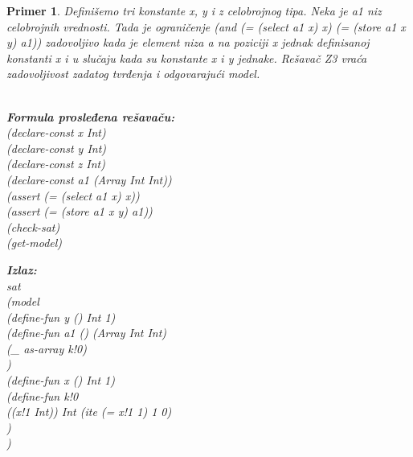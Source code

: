 \documentclass[12pt,oneside]{memoir}
\newcommand\tab[1][0.5cm]{\hspace*{#1}}
\newtheorem{primer}{Primer}
\begin{document}
\begin{primer} Definišemo tri konstante x, y i z celobrojnog tipa. Neka je a1 niz celobrojnih vrednosti. Tada je ograničenje (and (= (select a1 x) x) (= (store a1 x y) a1)) zadovoljivo kada je element niza a na poziciji x jednak definisanoj konstanti x i u slučaju kada su konstante x i y jednake.
Rešavač Z3 vraća zadovoljivost zadatog tvrđenja i odgovarajući model.
 \\ \\
\begin{minipage}[b]{0.45\textwidth}
\textbf{Formula prosleđena rešavaču:}
\\(declare-const x Int)
\\(declare-const y Int)
\\(declare-const z Int)
\\(declare-const a1 (Array Int Int))
\\(assert (= (select a1 x) x))
\\(assert (= (store a1 x y) a1))
\\(check-sat)
\\(get-model)
\end{minipage}
\hspace{1.3cm} 
\begin{minipage}[t]{0.5\textwidth}
\vspace{-5.3cm}
\textbf{Izlaz:}
\\sat
\\(model 
\\\tab(define-fun y () Int 1)
\\\tab(define-fun a1 () (Array Int Int)
\\\tab\tab(\_ as-array k!0)
\\\tab)
\\\tab(define-fun x () Int 1)
\\\tab(define-fun k!0 
\\\tab\tab((x!1 Int)) Int (ite (= x!1 1) 1 0)
\\\tab)
\\)
\end{minipage}
\end{primer} 
 
\end{document}
